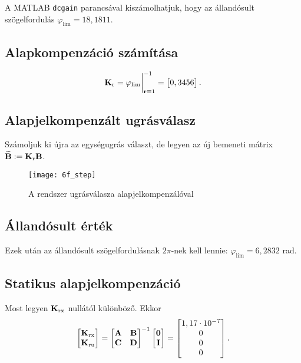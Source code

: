 A MATLAB \verb|dcgain| parancsával kiszámolhatjuk, hogy az állandósult szögelfordulás $\varphi_\text{lim} = 18,1811$.


\subsection{Alapkompenzáció számítása}

\begin{equation}
	\boldsymbol{\mathrm{K}}_\text{r} = \varphi_\text{lim}\bigg\rvert_{\boldsymbol{\mathrm{r}}\equiv1}^{-1} = \begin{bmatrix}0,3456\end{bmatrix}.
\end{equation}


\subsection{Alapjelkompenzált ugrásválasz}

Számoljuk ki újra az egységugrás választ, de
legyen az új bemeneti mátrix $\widetilde{\boldsymbol{\mathrm{B}}}:=\boldsymbol{\mathrm{K}}_\text{r}\boldsymbol{\mathrm{B}}$.

\begin{figure}[H]
	\centering
	\texttt{[image: 6f\_step]}
	\caption{A rendszer ugrásválasza alapjelkompenzálóval}
	\label{fig:6f_step}
\end{figure}


\subsection{Állandósult érték}

Ezek után az állandósult szögelfordulásnak $2\pi$-nek kell lennie: $\varphi_\text{lim} = 6,2832$ rad.


\subsection{Statikus alapjelkompenzáció}

Most legyen $\boldsymbol{\mathrm{K}}_\text{rx}$ nullától különböző.
Ekkor
\begin{equation}
	\begin{bmatrix}\boldsymbol{\mathrm{K}}_\text{rx}\\\boldsymbol{\mathrm{K}}_\text{ru}\end{bmatrix}=\begin{bmatrix}\boldsymbol{\mathrm{A}}&\boldsymbol{\mathrm{B}}\\\boldsymbol{\mathrm{C}}&\boldsymbol{\mathrm{D}}\end{bmatrix}^{-1}\begin{bmatrix}\boldsymbol{\mathrm{0}}\\\boldsymbol{\mathrm{I}}\end{bmatrix}
	= \begin{bmatrix}1,17\cdot10^{-7}\\0\\0\\0\end{bmatrix}.
\end{equation}

